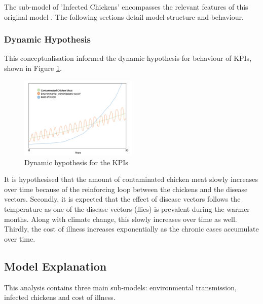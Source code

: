 The sub-model of 'Infected Chickens' encompasses the relevant features of this original model \parencite{rommens_infected_2020}. The following sections detail model structure and behaviour. 

\subsubsection*{Dynamic Hypothesis}

This conceptualisation informed the dynamic hypothesis for behaviour of KPIs, shown in Figure \ref{fig:dynamic_hypothesis}. 

\begin{figure}[h]
\centering
\includegraphics[width=0.50\textwidth]{images/KPI_dynamic_hypo.png}
\caption{Dynamic hypothesis for the KPIs}
\label{fig:dynamic_hypothesis}
\end{figure}

It is hypothesised that the amount of contaminated chicken meat slowly increases over time because of the reinforcing loop between the chickens and the disease vectors. 
Secondly, it is expected that the effect of disease vectors follows the temperature as one of the disease vectors (flies) is prevalent during the warmer months. Along with climate change, this slowly increases over time as well. 
Thirdly, the cost of illness increases exponentially as the chronic cases accumulate over time. 


\subsection{Model Explanation}
   
This analysis contains three main sub-models: environmental transmission, infected chickens and cost of illness. 

